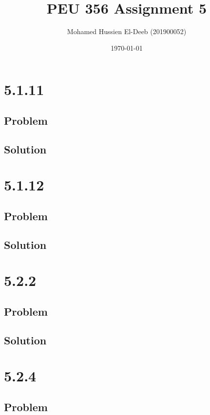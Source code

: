 \documentclass[12pt]{article}
\title{PEU 356 Assignment 5}
\author{Mohamed Hussien El-Deeb (201900052)}
\date{\today}
\begin{document}
\maketitle
\tableofcontents
\hypersetup{linkcolor=RoyalBlue4}

\newpage
\section{5.1.11}

\subsection{Problem}

\subsection{Solution}

\newpage
\section{5.1.12}

\subsection{Problem}

\subsection{Solution}

\newpage
\section{5.2.2}

\subsection{Problem}

\subsection{Solution}

\newpage
\section{5.2.4}

\subsection{Problem}
\end{document}

